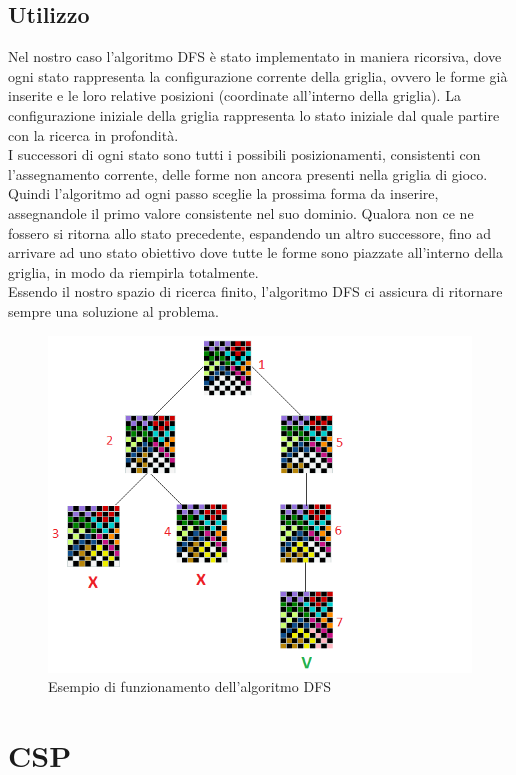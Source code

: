 \subsection{Utilizzo}
Nel nostro caso l'algoritmo DFS è stato implementato in maniera ricorsiva, dove ogni stato rappresenta la configurazione corrente della griglia, ovvero le forme già inserite e le loro relative posizioni (coordinate all'interno della griglia). La configurazione iniziale della griglia rappresenta lo stato iniziale dal quale partire con la ricerca in profondità.\\
I successori di ogni stato sono tutti i possibili posizionamenti, consistenti con l'assegnamento corrente, delle forme non ancora presenti nella griglia di gioco. Quindi l'algoritmo ad ogni passo sceglie la prossima forma da inserire, assegnandole il primo valore consistente nel suo dominio.
Qualora non ce ne fossero si ritorna allo stato precedente, espandendo un altro successore, fino ad arrivare ad uno stato obiettivo dove tutte le forme sono piazzate all'interno della griglia, in modo da riempirla totalmente.  \\
Essendo il nostro spazio di ricerca finito, l'algoritmo DFS ci assicura di ritornare sempre una soluzione al problema.
\begin{figure}[h]
	\centering
	\includegraphics[scale=1]{immagini/0}
	\caption{Esempio di funzionamento dell'algoritmo DFS}
	\label{fig:0}
\end{figure}

\section{CSP}
